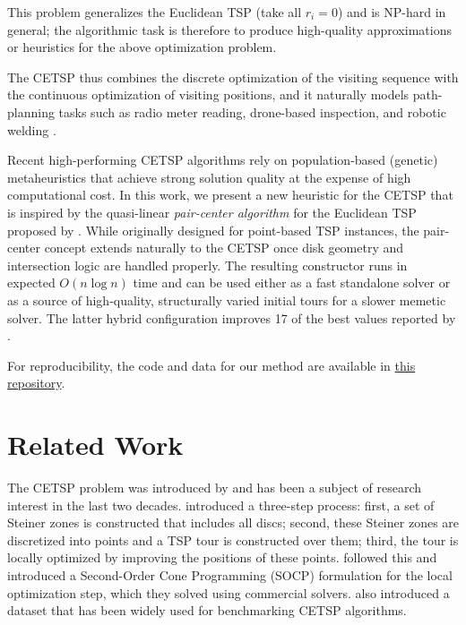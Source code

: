 \documentclass[11pt]{article}
\begin{document}
This problem generalizes the Euclidean TSP (take all \(r_i=0\)) and is NP-hard in general; the algorithmic task is therefore to produce high-quality approximations or heuristics for the above optimization problem.

The CETSP thus combines the discrete optimization of the visiting sequence with the continuous optimization of visiting positions, and it naturally models path-planning tasks such as radio meter reading, drone-based inspection, and robotic welding \parencite{LeiHao2024,DiPlacido2022}.

Recent high-performing CETSP algorithms rely on population-based (genetic) metaheuristics that achieve strong solution quality at the expense of high computational cost. In this work, we present a new heuristic for the CETSP that is inspired by the quasi-linear \emph{pair-center algorithm} for the Euclidean TSP proposed by \textcite{Formella2024}. While originally designed for point-based TSP instances, the pair-center concept extends naturally to the CETSP once disk geometry and intersection logic are handled properly. The resulting constructor runs in expected $O(n\log n)$ time and can be used either as a fast standalone solver or as a source of high-quality, structurally varied initial tours for a slower memetic solver. The latter hybrid configuration improves 17 of the best values reported by \textcite{LeiHao2024}.

For reproducibility, the code and data for our method are available in \href{https://anonymous.4open.science/r/cetsp-56F6}{this repository}.

\section{Related Work}
The CETSP problem was introduced by \textcite{Gulczynski2006} and has been a subject of research interest in the last two decades. \textcite{Gulczynski2006} introduced a three-step process: first, a set of Steiner zones is constructed that includes all discs; second, these Steiner zones are discretized into points and a TSP tour is constructed over them; third, the tour is locally optimized by improving the positions of these points. \textcite{Mennell2009,Mennell2011} followed this and introduced a Second-Order Cone Programming (SOCP) formulation for the local optimization step, which they solved using commercial solvers. \textcite{Mennell2009} also introduced a dataset that has been widely used for benchmarking CETSP algorithms.
\end{document}
